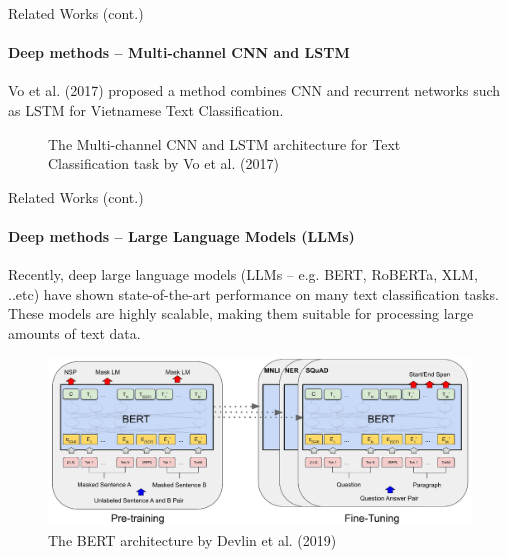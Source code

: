 \begin{frame}{Related Works (cont.)}
\framesubtitle{Deep methods -- Multi-channel CNN and LSTM}
Vo et al. (2017)\cite{Vo2017} proposed a method combines CNN and recurrent networks such as LSTM for Vietnamese Text Classification.
\begin{figure}
\centering
{}
\caption{The Multi-channel CNN and LSTM architecture for Text Classification task by Vo et al. (2017)\cite{Vo2017}}
\end{figure}
\end{frame}

\begin{frame}{Related Works (cont.)}
\framesubtitle{Deep methods -- Large Language Models (LLMs)}
Recently, deep large language models (LLMs -- e.g. BERT\cite{Devlin2019}, RoBERTa\cite{Liu2019}, XLM\cite{Conneau2020}, ..etc) have shown state-of-the-art performance on many text classification tasks. These models are highly scalable, making them suitable for processing large amounts of text data.

\begin{figure}
\centering
\includegraphics[scale=.5]{img/BERT.jpg}
\caption{The BERT architecture by Devlin et al. (2019)\cite{Devlin2019}}
\end{figure}
\end{frame}